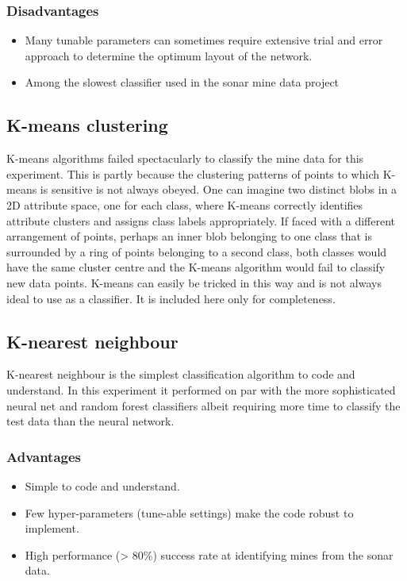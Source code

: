 \documentclass[10pt]{article}
\begin{document}
\subsubsection{Disadvantages}
\begin{itemize} 

\item Many tunable parameters can sometimes require extensive trial and error approach to determine the optimum layout of the network.

\item Among the slowest classifier used in the sonar mine data project

\end{itemize}









\subsection{K-means clustering}
K-means algorithms failed spectacularly to classify the mine data for this experiment. This is partly because the clustering patterns of points to which K-means is sensitive is not always obeyed. One can imagine two distinct blobs in a 2D attribute space, one for each class, where K-means correctly identifies attribute clusters and assigns class labels appropriately. If faced with a different arrangement of points, perhaps an inner blob belonging to one class that is surrounded by a ring of points belonging to a second class, both classes would have the same cluster centre and the K-means algorithm would fail to classify new data points. K-means can easily be tricked in this way and is not always ideal to use as a classifier. It is included here only for completeness.




\subsection{K-nearest neighbour}
K-nearest neighbour is the simplest classification algorithm to code and understand. In this experiment it performed on par with the more sophisticated neural net and random forest classifiers albeit requiring more time to classify the test data than the neural network. 

\subsubsection{Advantages}
\begin{itemize}
\item Simple to code and understand.

\item Few hyper-parameters (tune-able settings) make the code robust to implement.

\item High performance (> 80\%) success rate at identifying mines from the sonar data.

\end{itemize}
\end{document}
